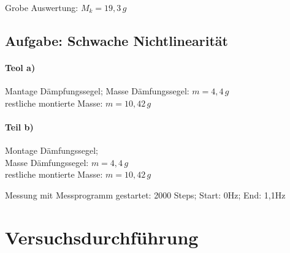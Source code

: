 Grobe Auswertung: \(M_k = 19,3 \, g\)

\subsection{Aufgabe: Schwache Nichtlinearität}
\paragraph{Teol a)}
Mantage Dämpfungssegel; Masse Dämfungssegel: \(m=4,4 \, g\)\\
restliche montierte Masse: \( m = 10,42 \,g \)


\paragraph{Teil b)}
Montage Dämfungssegel;\\
Masse Dämfungssegel: \(m=4,4 \, g\)\\
restliche montierte Masse: \( m = 10,42 \,g \)

Messung mit Messprogramm gestartet: 2000 Steps; Start: 0Hz; End: 1,1Hz



\section{Versuchsdurchführung}
\label{sec:durchfuehrung}

%
%
